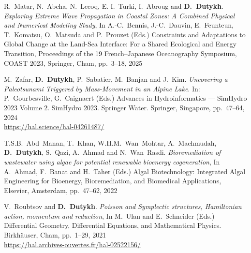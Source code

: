 \begin{etaremune}



  \item R.~Matar, N.~Abcha, N.~Lecoq, E.-I.~Turki, I.~Abroug and \textbf{D.~Dutykh}. \textit{Exploring Extreme Wave Propagation in Coastal Zones: A Combined Physical and Numerical Modeling Study}, In A.-C.~Bennis, J.-C.~Dauvin, E.~Feunteun, T.~Komatsu, O.~Matsuda and P.~Prouzet (Eds.) Constraints and Adaptations to Global Change at the Land-Sea Interface: For a Shared Ecological and Energy Transition, Proceedings of the 19 French--Japanese Oceanography Symposium, COAST 2023, Springer, Cham, pp.~3--18, 2025 %
  


  \item M.~Zafar, \textbf{D.~Dutykh}, P.~Sabatier, M.~Banjan and J.~Kim. \textit{Uncovering a Paleotsunami Triggered by Mass-Movement in an Alpine Lake}. In: P.~Gourbesville, G.~Caignaert (Eds.) Advances in Hydroinformatics --- SimHydro 2023 Volume 2. SimHydro 2023. Springer Water. Springer, Singapore, pp.~47--64, 2024 \\ %
  \url{https://hal.science/hal-04261487/}


  
  \item T.S.B.~Abd~Manan, T.~Khan, W.H.M.~Wan~Mohtar, A.~Machmudah, \textbf{D.~Dutykh}, S.~Qazi, A.~Ahmad and N.~Wan~Rasdi. \textit{Bioremediation of wastewater using algae for potential renewable bioenergy cogeneration}, In A.~Ahmad, F.~Banat and H.~Taher (Eds.) Algal Biotechnology: Integrated Algal Engineering for Bioenergy, Bioremediation, and Biomedical Applications, Elsevier, Amsterdam, pp.~47--62, 2022 %


  
  \item V.~Roubtsov and \textbf{D.~Dutykh}. \textit{Poisson and Symplectic structures, Hamiltonian action, momentum and reduction}, In M.~Ulan and E.~Schneider (Eds.) Differential Geometry, Differential Equations, and Mathematical Physics. Birkh\"auser, Cham, pp.~1--29, 2021 \\ %
  \url{https://hal.archives-ouvertes.fr/hal-02522156/}


\end{etaremune}
